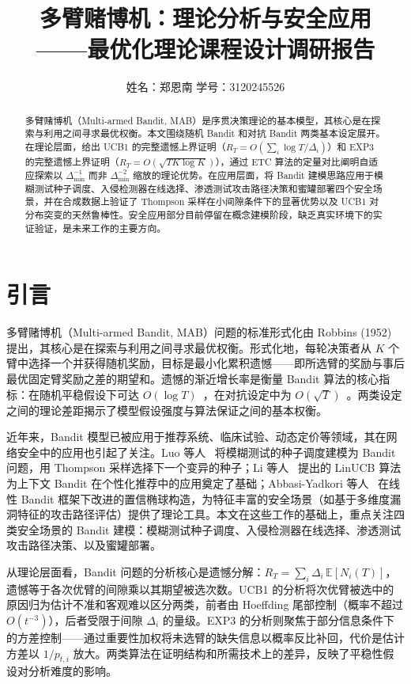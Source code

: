 \documentclass[UTF8,a4paper,11pt,zihao=5]{ctexart}
\title{\vspace{1.5cm} \heiti 多臂赌博机：理论分析与安全应用 \\[4pt] \large \kaishu ——最优化理论课程设计调研报告}
\author{\kaishu 姓名：郑恩南 \quad 学号：3120245526}
\date{}
\newcommand{\E}{\mathbb{E}}
\newcommand{\regret}[1]{R_{#1}}
\begin{document}
\maketitle
\thispagestyle{empty}

\begin{abstract}
多臂赌博机（Multi-armed Bandit, MAB）是序贯决策理论的基本模型，其核心是在探索与利用之间寻求最优权衡。本文围绕随机 Bandit 和对抗 Bandit 两类基本设定展开。在理论层面，给出 UCB1 的完整遗憾上界证明（$\regret{T} = O(\sum_i \log T / \Delta_i)$）和 EXP3 的完整遗憾上界证明（$\regret{T} = O(\sqrt{TK\log K})$），通过 ETC 算法的定量对比阐明自适应探索以 $\Delta_{\min}^{-1}$ 而非 $\Delta_{\min}^{-2}$ 缩放的理论优势。在应用层面，将 Bandit 建模思路应用于模糊测试种子调度、入侵检测器在线选择、渗透测试攻击路径决策和蜜罐部署四个安全场景，并在合成数据上验证了 Thompson 采样在小间隙条件下的显著优势以及 UCB1 对分布突变的天然鲁棒性。安全应用部分目前停留在概念建模阶段，缺乏真实环境下的实证验证，是未来工作的主要方向。
\end{abstract}

\newpage
\tableofcontents
\newpage

\section{引言}

多臂赌博机（Multi-armed Bandit, MAB）问题的标准形式化由 Robbins (1952) 提出，其核心是在探索与利用之间寻求最优权衡。形式化地，每轮决策者从 $K$ 个臂中选择一个并获得随机奖励，目标是最小化累积遗憾——即所选臂的奖励与事后最优固定臂奖励之差的期望和。遗憾的渐近增长率是衡量 Bandit 算法的核心指标：在随机平稳假设下可达 $O(\log T)$~\cite{lai1985}，在对抗设定中为 $O(\sqrt{T})$~\cite{auer2002b}。两类设定之间的理论差距揭示了模型假设强度与算法保证之间的基本权衡。

近年来，Bandit 模型已被应用于推荐系统、临床试验、动态定价等领域，其在网络安全中的应用也引起了关注。Luo 等人~\cite{tscheduler2024} 将模糊测试的种子调度建模为 Bandit 问题，用 Thompson 采样选择下一个变异的种子；Li 等人~\cite{li2010} 提出的 LinUCB 算法为上下文 Bandit 在个性化推荐中的应用奠定了基础；Abbasi-Yadkori 等人~\cite{abbasi2011} 在线性 Bandit 框架下改进的置信椭球构造，为特征丰富的安全场景（如基于多维度漏洞特征的攻击路径评估）提供了理论工具。本文在这些工作的基础上，重点关注四类安全场景的 Bandit 建模：模糊测试种子调度、入侵检测器在线选择、渗透测试攻击路径决策、以及蜜罐部署。

从理论层面看，Bandit 问题的分析核心是遗憾分解：$\regret{T} = \sum_i \Delta_i \, \E[N_i(T)]$，遗憾等于各次优臂的间隙乘以其期望被选次数。UCB1 的分析将次优臂被选中的原因归为估计不准和客观难以区分两类，前者由 Hoeffding 尾部控制（概率不超过 $O(t^{-3})$），后者受限于间隙 $\Delta_i$ 的量级。EXP3 的分析则聚焦于部分信息条件下的方差控制——通过重要性加权将未选臂的缺失信息以概率反比补回，代价是估计方差以 $1/p_{t,i}$ 放大。两类算法在证明结构和所需技术上的差异，反映了平稳性假设对分析难度的影响。
\end{document}
